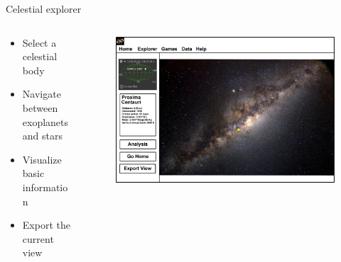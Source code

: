 \documentclass[9pt]{beamer}
\begin{document}
\begin{frame}{Celestial explorer}

    \begin{columns}[c, onlytextwidth]

        \begin{column}{0.28\textwidth}

            \begin{itemize}
                \item Select a celestial body
                \item Navigate between exoplanets and stars
                \item Visualize basic information
                \item Export the current view
            \end{itemize}

        \end{column}
        \hfill
        \begin{column}{0.7\textwidth}

            \begin{figure}[H]
                \includegraphics[width=\textwidth]{./img/explorer.jpg}
            \end{figure}

        \end{column}

    \end{columns}

\end{frame}
\end{document}

